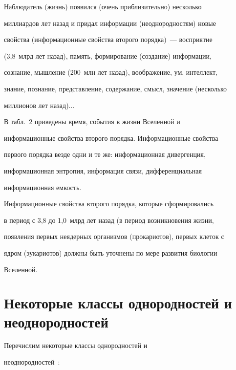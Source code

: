    Наблюдатель (жизнь) появился (очень приблизительно) несколько 


миллиардов лет назад и придал информации (неоднородностям) новые 


свойства (информационные свойства второго порядка)~--- восприятие 


(3,8~млрд лет назад), память, формирование (создание) информации, 


сознание, мышление (200~млн лет назад), воображение, ум, интеллект, 


знание, познание, представление, содержание, смысл, значение (несколько 


миллионов лет назад)$\ldots$


     


     В табл.~2 приведены время, события в жизни Вселенной и 


информационные свойства второго порядка. Информационные свойства 


первого порядка везде одни и те же: информационная дивергенция, 


информационная энтропия, информация связи, дифференциальная 


информационная емкость. 


     


     


     Информационные свойства второго порядка, которые сформировались 


в период с 3,8 до 1,0~млрд лет назад (в период возникновения жизни, 


появления первых неядерных организмов (прокариотов), первых клеток с 


ядром (эукариотов) должны быть уточнены по мере развития биологии 


Вселенной.


     


     \section{Некоторые классы однородностей и неоднородностей}





Перечислим некоторые классы однородностей и 


неоднородностей~\cite{10-2-15}:


